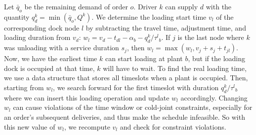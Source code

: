 \documentclass[authoryear,preprint,review,11pt]{elsarticle}
\begin{document}
Let $\bar{q}_o$ be the remaining demand of order $o$. Driver $k$ can supply $d$ with the quantity $q^k_d= \min(\bar{q}_o,Q^k)$. We determine the loading start time $v_l$ of the corresponding dock node $l$ by subtracting the travel time, adjustment time, and loading duration from $v_d$: $w_l = v_d - t_{dl} - \alpha_b - q^k_{d}/\tau^l{_b} $. If $j$ is the last node where $k$ was unloading with a service duration $s_j$, then $w_l= \max(w_l, v_j + s_{j} + t_{jl})$. Now, we have the earliest time $k$ can start loading at plant $b$, but if the loading dock is occupied at that time, $k$ will have to wait. To find the real loading time, we use a data structure that stores all timeslots when a plant is occupied. Then, starting from $w_l$, we search forward for the first timeslot with duration $q^k_{d}/\tau^l{_b}$ where we can insert this loading operation and update $w_l$ accordingly. Changing $w_l$ can cause violations of the time window or cold-joint constraints, especially for an order's subsequent deliveries, and thus make the schedule infeasible. So with this new value of $w_l$, we recompute $v_l$ and check for constraint violations.
\end{document}
